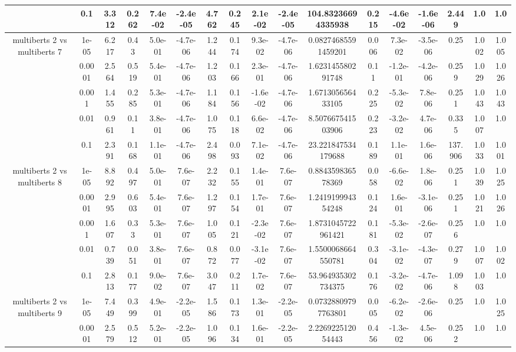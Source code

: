 \begin{tabular}{|c|c|c|c|c|c|c|c|c|c|c|c|c|c|c|c|c|}
 & 0.1 & 3.312 & 0.262 & 7.4e-02 & -2.4e-05 & 4.762 & 0.245 & 2.1e-02 & -2.4e-05 & 104.83236694335938 & 0.215 & -4.6e-02 & -1.6e-06 & 2.449 & 1.0 & 1.0 \\
\hline
\multirow{5}{*}{multiberts 2 vs multiberts 7} & 1e-05 & 6.217 & 0.43 & 5.0e-01 & -4.7e-06 & 1.244 & 0.174 & 9.3e-02 & -4.7e-06 & 0.08274685591459201 & 0.006 & 7.3e-02 & -3.5e-06 & 0.25 & 1.002 & 1.005 \\
 & 0.0001 & 2.564 & 0.519 & 5.4e-01 & -4.7e-06 & 1.203 & 0.166 & 2.3e-01 & -4.7e-06 & 1.623145580291748 & 0.11 & -1.2e-01 & -4.2e-06 & 0.259 & 1.029 & 1.026 \\
 & 0.001 & 1.455 & 0.285 & 5.3e-01 & -4.7e-06 & 1.184 & 0.156 & -1.6e-02 & -4.7e-06 & 1.671305656433105 & 0.225 & -5.3e-02 & 7.8e-06 & 0.251 & 1.043 & 1.043 \\
 & 0.01 & 0.961 & 0.11 & 3.8e-01 & -4.7e-06 & 1.075 & 0.118 & 6.6e-02 & -4.7e-06 & 8.507667541503906 & 0.223 & -3.2e-02 & 4.7e-06 & 0.335 & 1.007 & 1.0 \\
 & 0.1 & 2.391 & 0.168 & 1.1e-01 & -4.7e-06 & 2.498 & 0.093 & 7.1e-02 & -4.7e-06 & 23.221847534179688 & 0.189 & 1.1e-01 & 1.6e-06 & 137.906 & 1.033 & 1.001 \\
\hline
\multirow{5}{*}{multiberts 2 vs multiberts 8} & 1e-05 & 8.892 & 0.497 & 5.0e-01 & 7.6e-07 & 2.232 & 0.155 & 1.4e-01 & 7.6e-07 & 0.884359836578369 & 0.058 & -6.6e-02 & 1.8e-06 & 0.251 & 1.039 & 1.025 \\
 & 0.0001 & 2.995 & 0.603 & 5.4e-01 & 7.6e-07 & 1.297 & 0.154 & 1.7e-01 & 7.6e-07 & 1.241919994354248 & 0.124 & 1.6e-01 & -3.1e-06 & 0.251 & 1.021 & 1.026 \\
 & 0.001 & 1.607 & 0.33 & 5.3e-01 & 7.6e-07 & 1.005 & 0.121 & -2.3e-02 & 7.6e-07 & 1.8731045722961421 & 0.181 & -5.3e-02 & -2.6e-07 & 0.256 & 1.0 & 1.0 \\
 & 0.01 & 0.739 & 0.051 & 3.8e-01 & 7.6e-07 & 0.872 & 0.077 & -3.1e-02 & 7.6e-07 & 1.5500068664550781 & 0.304 & -3.1e-02 & -4.3e-07 & 0.279 & 1.007 & 1.002 \\
 & 0.1 & 2.813 & 0.177 & 9.0e-02 & 7.6e-07 & 3.047 & 0.211 & 1.7e-02 & 7.6e-07 & 53.964935302734375 & 0.176 & -3.2e-02 & -4.7e-06 & 1.098 & 1.003 & 1.0 \\
\hline
\multirow{5}{*}{multiberts 2 vs multiberts 9} & 1e-05 & 7.449 & 0.399 & 4.9e-01 & -2.2e-05 & 1.586 & 0.173 & 1.3e-01 & -2.2e-05 & 0.07328809797763801 & 0.005 & -6.2e-02 & -2.6e-06 & 0.25 & 1.0 & 1.025 \\
 & 0.0001 & 2.579 & 0.512 & 5.2e-01 & -2.2e-05 & 1.096 & 0.134 & 1.6e-01 & -2.2e-05 & 2.226922512054443 & 0.456 & -1.3e-02 & 4.5e-06 & 0.252 & 1.0 & 1.0 \\

\end{tabular}
